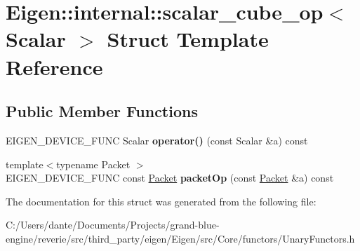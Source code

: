 \hypertarget{struct_eigen_1_1internal_1_1scalar__cube__op}{}\section{Eigen\+::internal\+::scalar\+\_\+cube\+\_\+op$<$ Scalar $>$ Struct Template Reference}
\label{struct_eigen_1_1internal_1_1scalar__cube__op}
\subsection*{Public Member Functions}
\begin{DoxyCompactItemize}
\item 
\mbox{\label{struct_eigen_1_1internal_1_1scalar__cube__op_a1a5188662e3acae2af2041a8bc5250f7}} 
E\+I\+G\+E\+N\+\_\+\+D\+E\+V\+I\+C\+E\+\_\+\+F\+U\+NC Scalar {\bfseries operator()} (const Scalar \&a) const
\item 
\mbox{\label{struct_eigen_1_1internal_1_1scalar__cube__op_a2711b3e32d6312b473b54a2ecbd7ddb8}} 
{\footnotesize template$<$typename Packet $>$ }\\E\+I\+G\+E\+N\+\_\+\+D\+E\+V\+I\+C\+E\+\_\+\+F\+U\+NC const \mbox{\hyperlink{union_eigen_1_1internal_1_1_packet}{Packet}} {\bfseries packet\+Op} (const \mbox{\hyperlink{union_eigen_1_1internal_1_1_packet}{Packet}} \&a) const
\end{DoxyCompactItemize}


The documentation for this struct was generated from the following file\+:\begin{DoxyCompactItemize}
\item 
C\+:/\+Users/dante/\+Documents/\+Projects/grand-\/blue-\/engine/reverie/src/third\+\_\+party/eigen/\+Eigen/src/\+Core/functors/Unary\+Functors.\+h\end{DoxyCompactItemize}
